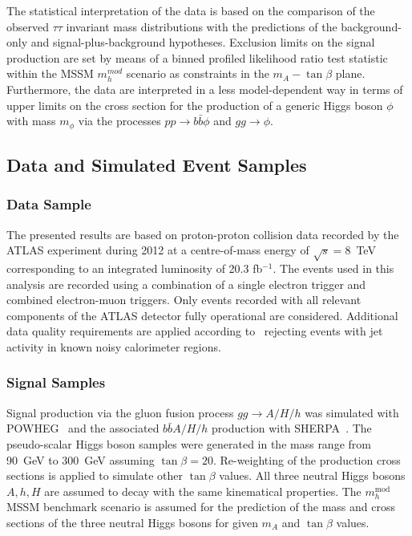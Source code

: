 The statistical interpretation of the data is based on the 
comparison of the observed $\tau\tau$ invariant mass distributions with the predictions of the  background-only and signal-plus-background
hypotheses. Exclusion limits on the signal production are set by means of a binned profiled likelihood ratio
test statistic within the MSSM $m_{h}^{mod}$ scenario as constraints in the 
 $m_A - \tan\beta$ plane. Furthermore, the data are interpreted in a less model-dependent
way in terms of  upper limits on the cross section for the production of a generic Higgs boson $\phi$ with   mass  $m_\phi$ 
via the  processes $pp \rightarrow b\bar{b}\phi$ and $gg \rightarrow \phi$.


 




\subsection{Data and Simulated Event Samples}
\label{sec:sample}
\subsubsection{Data Sample}

The  presented results  are based on proton-proton collision data
recorded by the ATLAS experiment during 2012 at a centre-of-mass energy of $\sqrt{s}=8$~TeV
corresponding to an integrated luminosity of 20.3 fb$^{-1}$.
The events used in this analysis are recorded using a combination of a
single electron trigger  and combined electron-muon triggers. Only events 
recorded with  all  relevant components of the ATLAS detector 
fully operational are considered.
Additional data quality requirements are applied according to~\cite{ATLASCLEANING} rejecting 
events %
with jet activity in known noisy calorimeter regions. 




\subsubsection{Signal Samples}
Signal production via the gluon fusion process $gg\rightarrow A/H/h$
was simulated with POWHEG~\cite{POWHEG} and the associated
$b\bar{b}A/H/h$ production with SHERPA~\cite{SHERPA}.  The
pseudo-scalar Higgs boson samples were generated in the mass range from
90~GeV to 300~GeV assuming $\tan\beta = 20$. Re-weighting of the production cross sections is applied 
to simulate other $\tan\beta$ values. All three  neutral Higgs bosons $A,h,H$ are assumed to decay 
with the same kinematical properties. The $m_h^{\mathrm{mod}}$ MSSM benchmark scenario is assumed
for the prediction of the mass and cross sections of the three neutral Higgs bosons for  given $m_A$ and $\tan\beta$ values.


